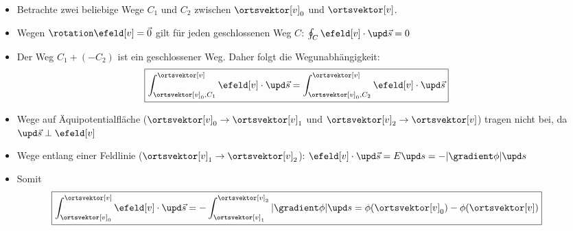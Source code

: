 \begin{frame}
\begin{columns}[T]
\begin{column}{.4\linewidth}
{}
\end{column}
\begin{column}{.6\linewidth}
  \begin{itemize}[<+->]
    \item Betrachte zwei beliebige Wege $C_1$ und $C_2$ zwischen
      $\ortsvektor[v]_0$ und $\ortsvektor[v]$.
      \item Wegen $\rotation \efeld[v] =\vec{0} $ gilt für jeden geschlossenen
        Weg $C$:
        $
        \oint_C \efeld[v]\cdot\upd\vec{s} = 0 
        $
        \item Der Weg $C_1 + (-C_2)$ ist ein geschlossener Weg. Daher
          folgt die \alert{Wegunabhängigkeit}:
          $$
       \boxed{\int_{\ortsvektor[v]_0, C_1}^{\ortsvektor[v]} \efeld[v]\cdot\upd\vec{s} =        \int_{\ortsvektor[v]_0, C_2}^{\ortsvektor[v]} \efeld[v]\cdot\upd\vec{s}} 
       $$
       \item Wege auf Äquipotentialfläche ($\ortsvektor[v]_0\to\ortsvektor[v]_1$ und
         $\ortsvektor[v]_2\to\ortsvektor[v]$) tragen nicht bei, da $\upd\vec{s}
         \perp \efeld[v]$
         \item Wege entlang einer Feldlinie ($\ortsvektor[v]_1\to\ortsvektor[v]_2$):
           $\efeld[v]\cdot\upd\vec{s} = E \upd s = -|\gradient\phi| \upd s$
         \item Somit
           $$
             \boxed{\int_{\ortsvektor[v]_0}^{\ortsvektor[v]} \efeld[v]\cdot\upd\vec{s} = 
                                                                       -
                                                                       \int_{\ortsvektor[v]_1}^{\ortsvektor[v]_2}
                                                                       |\gradient\phi|\upd
                                                                       s
                                                                       =
                                                                       \phi(\ortsvektor[v]_0)
                                                                       - \phi(\ortsvektor[v])}
             $$
    \end{itemize}
\end{column}
\end{columns}
\end{frame}

